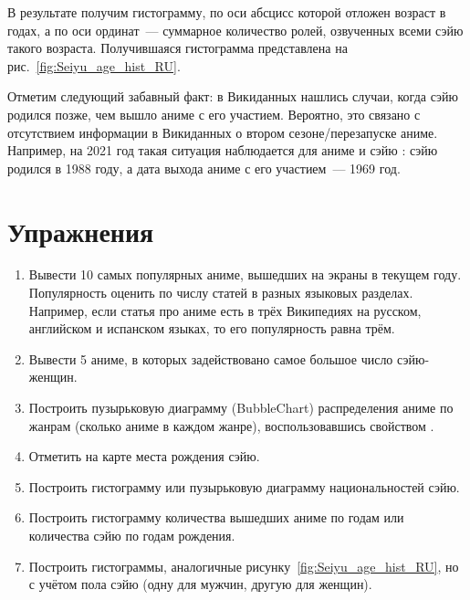 В результате получим гистограмму, по оси абсцисс которой отложен возраст в годах, а по оси ординат~--- суммарное количество ролей, озвученных всеми сэйю такого возраста. Получившаяся гистограмма представлена на рис.~\ref{fig:Seiyu_age_hist_RU}. 

\begin{figure*}[h]

    \setlength{\fboxsep}{0pt}%
    \setlength{\fboxrule}{1pt}%
	\caption[Гистограмма с числом аниме, озвученных сэйю разных возрастов, 2021.]{Гистограмма с числом аниме, озвученных различными сэйю, 2021. Гистограмма построена на основе данных, полученных с помощью запросов~\protect\ref{lst:seiyu_bd_w_service} (или~\protect\ref{lst:seiyu_bd_w_rdfs}), \protect\ref{lst:all_anime_releases} и \protect\ref{lst:link_anime_seiyu}.}%
    \label{fig:Seiyu_age_hist_RU}%
\end{figure*} 
 	
Отметим следующий забавный факт: в Викиданных нашлись случаи, когда сэйю родился позже, чем вышло аниме с его участием. Вероятно, это связано с отсутствием информации в Викиданных о втором сезоне/перезапуске аниме. Например, на 2021 год такая ситуация наблюдается для аниме  и сэйю : сэйю родился в 1988 году, а дата выхода аниме с его участием~--- 1969 год.

\section{Упражнения}

\begin{enumerate}
    \item Вывести 10 самых популярных аниме, вышедших на экраны в текущем году. Популярность оценить по числу статей в разных языковых разделах. Например, если статья про аниме есть в трёх Википедиях на русском, английском и испанском языках, то его популярность равна трём. 
    \item Вывести 5 аниме, в которых задействовано самое большое число сэйю-женщин.
    \item Построить пузырьковую диаграмму (BubbleChart) распределения аниме по жанрам (сколько аниме в каждом жанре), воспользовавшись свойством .
    \item Отметить на карте места рождения сэйю.
    \item Построить гистограмму или пузырьковую диаграмму национальностей сэйю.
    \item Построить гистограмму количества вышедших аниме по годам или количества сэйю по годам рождения.
    \item Построить гистограммы, аналогичные рисунку~\ref{fig:Seiyu_age_hist_RU}, но с учётом пола сэйю (одну для мужчин, другую для женщин).
\end{enumerate}
